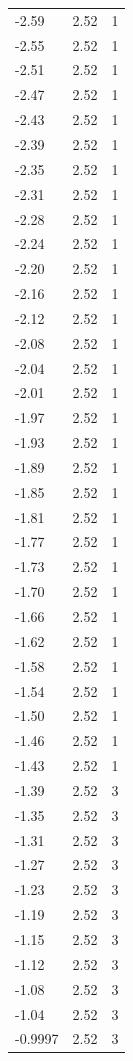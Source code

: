 \begin{longtable}{lrr}
  -2.59 & 2.52 & 1 \\
  -2.55 & 2.52 & 1 \\
  -2.51 & 2.52 & 1 \\
  -2.47 & 2.52 & 1 \\
  -2.43 & 2.52 & 1 \\
  -2.39 & 2.52 & 1 \\
  -2.35 & 2.52 & 1 \\
  -2.31 & 2.52 & 1 \\
  -2.28 & 2.52 & 1 \\
  -2.24 & 2.52 & 1 \\
  -2.20 & 2.52 & 1 \\
  -2.16 & 2.52 & 1 \\
  -2.12 & 2.52 & 1 \\
  -2.08 & 2.52 & 1 \\
  -2.04 & 2.52 & 1 \\
  -2.01 & 2.52 & 1 \\
  -1.97 & 2.52 & 1 \\
  -1.93 & 2.52 & 1 \\
  -1.89 & 2.52 & 1 \\
  -1.85 & 2.52 & 1 \\
  -1.81 & 2.52 & 1 \\
  -1.77 & 2.52 & 1 \\
  -1.73 & 2.52 & 1 \\
  -1.70 & 2.52 & 1 \\
  -1.66 & 2.52 & 1 \\
  -1.62 & 2.52 & 1 \\
  -1.58 & 2.52 & 1 \\
  -1.54 & 2.52 & 1 \\
  -1.50 & 2.52 & 1 \\
  -1.46 & 2.52 & 1 \\
  -1.43 & 2.52 & 1 \\
  -1.39 & 2.52 & 3 \\
  -1.35 & 2.52 & 3 \\
  -1.31 & 2.52 & 3 \\
  -1.27 & 2.52 & 3 \\
  -1.23 & 2.52 & 3 \\
  -1.19 & 2.52 & 3 \\
  -1.15 & 2.52 & 3 \\
  -1.12 & 2.52 & 3 \\
  -1.08 & 2.52 & 3 \\
  -1.04 & 2.52 & 3 \\
  -0.9997 & 2.52 & 3 \\

\end{longtable}

